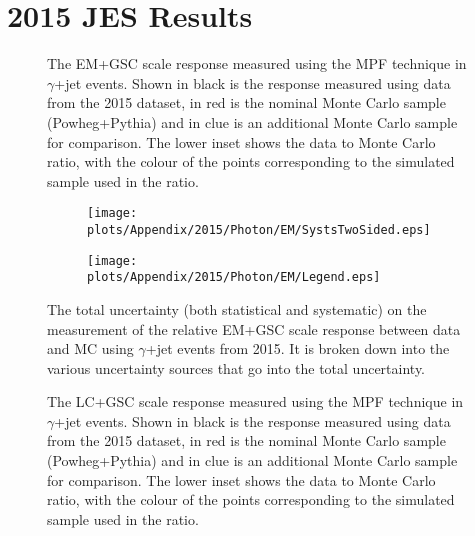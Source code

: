 \chapter{2015 JES Results}
\label{App:2015}

\begin{figure}[!ht]
  \begin{center}
  \end{center}
  \caption[EM scale response using $\gamma$+jet in 2015]
  {\small The EM+GSC scale response measured using the MPF technique in $\gamma$+jet events.  Shown in black is the response measured using data from the 2015 dataset, in red is the nominal Monte Carlo sample (Powheg+Pythia) and in clue is an additional Monte Carlo sample for comparison.  The lower inset shows the data to Monte Carlo ratio, with the colour of the points corresponding to the simulated sample used in the ratio.  }
  \label{plot:GammaJetEM2015App}
\end{figure}


\begin{figure}[!ht]
\captionsetup[subfigure]{labelformat=empty}
 \begin{center}
   \begin{subfigure}{0.5\textwidth}
     \hspace{-3cm}
     \texttt{[image: plots/Appendix/2015/Photon/EM/SystsTwoSided.eps]}
   \end{subfigure}
   \begin{subfigure}{0.5\textwidth}
     \hspace{-3cm}
     \texttt{[image: plots/Appendix/2015/Photon/EM/Legend.eps]}
   \end{subfigure}
 \end{center}
 \caption[Uncertainty on the EM+GSC scale response measurement using $\gamma$+jet]
 {\small The total uncertainty (both statistical and systematic) on the measurement of the relative EM+GSC scale response between data and MC using $\gamma$+jet events from 2015.  It is broken down into the various uncertainty sources that go into the total uncertainty.  }
 \label{Fig:GammaJetSystsEM2015}
\end{figure}

\begin{figure}[!ht]
  \begin{center}
  \end{center}
  \caption[LC scale response using $\gamma$+jet in 2015]
  {\small The LC+GSC scale response measured using the MPF technique in $\gamma$+jet events.  Shown in black is the response measured using data from the 2015 dataset, in red is the nominal Monte Carlo sample (Powheg+Pythia) and in clue is an additional Monte Carlo sample for comparison.  The lower inset shows the data to Monte Carlo ratio, with the colour of the points corresponding to the simulated sample used in the ratio.  }
  \label{plot:GammaJetLC2015App}
\end{figure}


